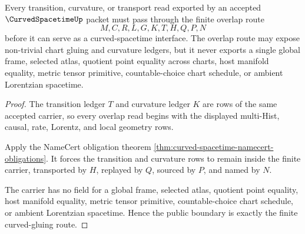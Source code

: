 \begin{theorem}
\label{thm:curved-spacetime-no-global-frame-boundary}
Every transition, curvature, or transport read exported by an accepted $\CurvedSpacetimeUp$ packet must pass through the finite overlap route
$$
M,C,R,L,G,K,T,H,Q,P,N
$$
before it can serve as a curved-spacetime interface. The overlap route may expose non-trivial chart gluing and curvature ledgers, but it never exports a single global frame, selected atlas, quotient point equality across charts, host manifold equality, metric tensor primitive, countable-choice chart schedule, or ambient Lorentzian spacetime.
\end{theorem}
\begin{proof}
The transition ledger $T$ and curvature ledger $K$ are rows of the same accepted carrier, so every overlap read begins with the displayed multi-Hist, causal, rate, Lorentz, and local geometry rows.

Apply the NameCert obligation theorem \autoref{thm:curved-spacetime-namecert-obligations}. It forces the transition and curvature rows to remain inside the finite carrier, transported by $H$, replayed by $Q$, sourced by $P$, and named by $N$.

The carrier has no field for a global frame, selected atlas, quotient point equality, host manifold equality, metric tensor primitive, countable-choice chart schedule, or ambient Lorentzian spacetime. Hence the public boundary is exactly the finite curved-gluing route.
\end{proof}




